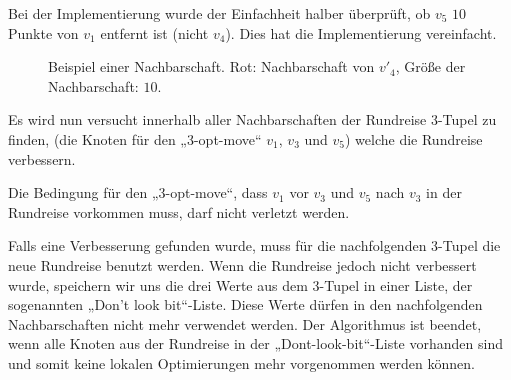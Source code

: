 \begin{bem}
  Bei der Implementierung wurde der Einfachheit halber  überprüft, 
  ob $v_5$ $10$ Punkte von $v_1$ entfernt ist (nicht $v_4$). Dies hat
  die Implementierung vereinfacht. 
\end{bem}
\begin{figure}[bh]
  \centering
  \caption[Beispiel einer Nachbarschaft $\mathcal{N}(v)$]{Beispiel
  einer Nachbarschaft. Rot: Nachbarschaft von $v'_4$, Größe der
  Nachbarschaft: $10$.}
\end{figure}
Es wird nun versucht innerhalb aller Nachbarschaften der Rundreise 3-Tupel zu finden, (die
Knoten für den „3-opt-move“ $v_1$, $v_3$ und $v_5$) welche die Rundreise
verbessern.
\begin{bem}
Die Bedingung für den „3-opt-move“, dass $v_1$ vor $v_3$ und $v_5$ nach
  $v_3$ in der Rundreise vorkommen muss, darf nicht verletzt werden.
\end{bem}
Falls eine Verbesserung gefunden wurde, muss für die nachfolgenden
3-Tupel die neue Rundreise benutzt werden. Wenn die Rundreise jedoch
nicht verbessert wurde, speichern wir uns die drei Werte aus dem 3-Tupel
in einer Liste, der sogenannten „Don't look bit“-Liste. Diese Werte dürfen in den
nachfolgenden Nachbarschaften nicht mehr verwendet werden. Der
Algorithmus ist beendet, wenn alle Knoten aus der Rundreise in der
„Dont-look-bit“-Liste vorhanden sind und somit keine lokalen
Optimierungen mehr vorgenommen werden können.
\newpage

